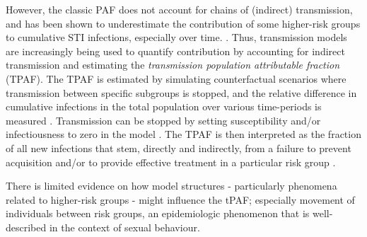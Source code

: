 However, the classic PAF does not account for chains of (indirect) transmission, and has been 
shown to underestimate the contribution of some higher-risk groups to cumulative 
STI infections, especially over time. \citep{Mishra2014a}. Thus, 
transmission models are increasingly being used to quantify
contribution by accounting for indirect transmission and estimating   
the \textit{transmission population attributable fraction} (TPAF).
The TPAF is estimated by
simulating counterfactual scenarios where transmission
between specific subgroups is stopped, and
the relative difference in cumulative infections in the total population
over various time-periods is measured \citep{Mishra2016,Mukandavire2018}.  %
Transmission can be stopped by
setting susceptibility and/or infectiousness to zero in the model \citep{Mishra2012}. %
The TPAF is then interpreted as
the fraction of all new infections that stem, directly and indirectly, from
a failure to prevent acquisition and/or to provide effective treatment
in a particular risk group \citep{Mishra2016}.  %
\par
There is limited evidence on how model structures - particularly phenomena 
related to higher-risk groups - might influence the tPAF; %
especially
movement of individuals between risk groups, an epidemiologic phenomenon 
that is well-described in the context of sexual behaviour. %

